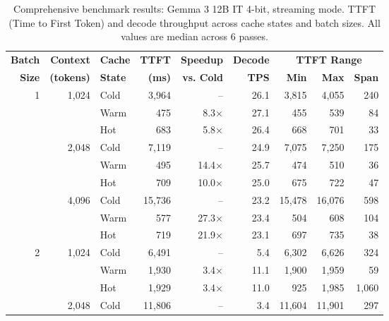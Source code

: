 
\begin{table}[t]
\centering
\caption{Comprehensive benchmark results: Gemma 3 12B IT 4-bit, streaming mode.
TTFT (Time to First Token) and decode throughput across cache states and batch sizes.
All values are median across 6 passes.}
\label{tab:comprehensive}
\begin{tabular}{rrlrrrrrr}
\toprule
\textbf{Batch} & \textbf{Context} & \textbf{Cache} & \textbf{TTFT} & \textbf{Speedup} & \textbf{Decode} & \multicolumn{3}{c}{\textbf{TTFT Range}} \\
\textbf{Size} & \textbf{(tokens)} & \textbf{State} & \textbf{(ms)} & \textbf{vs. Cold} & \textbf{TPS} & \textbf{Min} & \textbf{Max} & \textbf{Span} \\
\midrule
\multirow{9}{*}{1}
  & \multirow{3}{*}{1,024} & Cold & 3,964  & --    & 26.1 & 3,815 & 4,055 & 240 \\
  &                        & Warm & 475    & 8.3×  & 27.1 & 455   & 539   & 84 \\
  &                        & Hot  & 683    & 5.8×  & 26.4 & 668   & 701   & 33 \\
\cmidrule{2-9}
  & \multirow{3}{*}{2,048} & Cold & 7,119  & --    & 24.9 & 7,075 & 7,250 & 175 \\
  &                        & Warm & 495    & 14.4× & 25.7 & 474   & 510   & 36 \\
  &                        & Hot  & 709    & 10.0× & 25.0 & 675   & 722   & 47 \\
\cmidrule{2-9}
  & \multirow{3}{*}{4,096} & Cold & 15,736 & --    & 23.2 & 15,478 & 16,076 & 598 \\
  &                        & Warm & 577    & 27.3× & 23.4 & 504    & 608    & 104 \\
  &                        & Hot  & 719    & 21.9× & 23.1 & 697    & 735    & 38 \\
\midrule
\multirow{9}{*}{2}
  & \multirow{3}{*}{1,024} & Cold & 6,491  & --    & 5.4  & 6,302 & 6,626 & 324 \\
  &                        & Warm & 1,930  & 3.4×  & 11.1 & 1,900 & 1,959 & 59 \\
  &                        & Hot  & 1,929  & 3.4×  & 11.0 & 925   & 1,985 & 1,060 \\
\cmidrule{2-9}
  & \multirow{3}{*}{2,048} & Cold & 11,806 & --    & 3.4  & 11,604 & 11,901 & 297 \\

\end{tabular}
\end{table}
